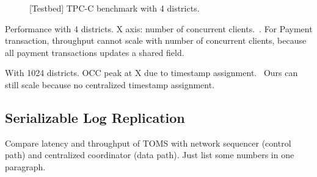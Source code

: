 \begin{figure}[t]
\centering
	\hspace{0.02\textwidth}
    \hspace{0.02\textwidth}
\caption{[Testbed] TPC-C benchmark with 4 districts.}
\label{fig:tpc-c}
\end{figure}

Performance with 4 districts.
X axis: number of concurrent clients.~\cite{yu2014staring}.
For Payment transaction, throughput cannot scale with number of concurrent clients, because all payment transactions updates a shared field.

With 1024 districts.
OCC peak at X due to timestamp assignment.~\cite{yu2014staring} Ours can still scale because no centralized timestamp assignment.

\subsection{Serializable Log Replication}
\label{subsec:eval-replication}

Compare latency and throughput of TOMS with network sequencer (control path) and centralized coordinator (data path).
Just list some numbers in one paragraph.




